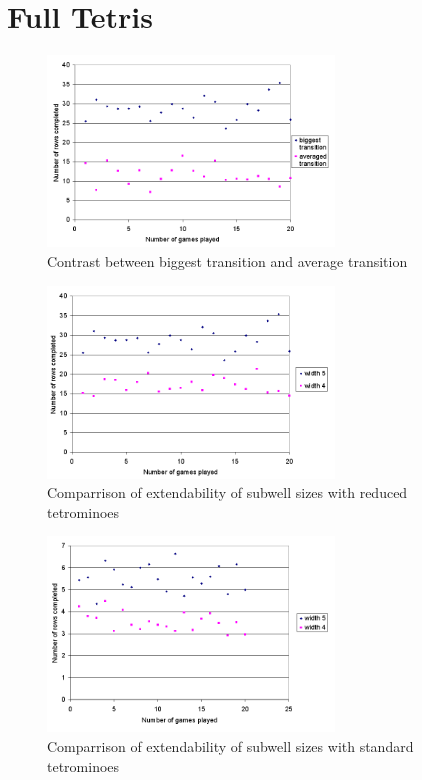 \documentclass{rucsthesis}
\begin{document}
\chapter{Full Tetris}

\begin{figure}[h]
\centering
\includegraphics[width=3in]{multisingle.png}
\caption{Contrast between biggest transition and average transition}
\label{fig:comparemelax}
\end{figure}

\begin{figure}[h]
\centering
\includegraphics[width=3in]{widthcomparrison.png}
\caption{Comparrison of extendability of subwell sizes with reduced tetrominoes}
\label{fig:comparemelax}
\end{figure}

\begin{figure}[h]
\centering
\includegraphics[width=3in]{widthcomparrisonfulltet.png}
\caption{Comparrison of extendability of subwell sizes with standard tetrominoes}
\label{fig:comparemelax}
\end{figure}
\end{document}

